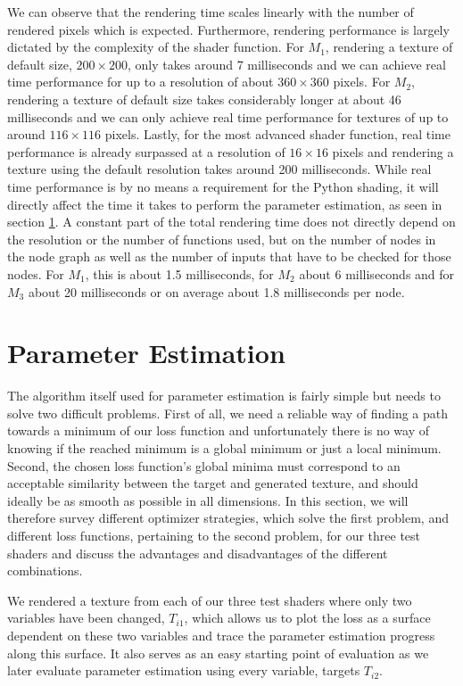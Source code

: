 We can observe that the rendering time scales linearly with the number of rendered pixels which is expected. Furthermore, rendering performance is largely dictated by the complexity of the shader function. For $M_1$, rendering a texture of default size, $200\times 200$, only takes around 7 milliseconds and we can achieve real time performance for up to a resolution of about $360\times 360$ pixels. For $M_2$, rendering a texture of default size takes considerably longer at about 46 milliseconds and we can only achieve real time performance for textures of up to around $116\times 116$ pixels. Lastly, for the most advanced shader function, real time performance is already surpassed at a resolution of $16\times 16$ pixels and rendering a texture using the default resolution takes around 200 milliseconds. While real time performance is by no means a requirement for the Python shading, it will directly affect the time it takes to perform the parameter estimation, as seen in section \ref{sec:EvalParameterEstimation}. A constant part of the total rendering time does not directly depend on the resolution or the number of functions used, but on the number of nodes in the node graph as well as the number of inputs that have to be checked for those nodes. For $M_1$, this is about 1.5 milliseconds, for $M_2$ about 6 milliseconds and for $M_3$ about 20 milliseconds or on average about 1.8 milliseconds per node. 

\section{Parameter Estimation}\label{sec:EvalParameterEstimation}

The algorithm itself used for parameter estimation is fairly simple but needs to solve two difficult problems. First of all, we need a reliable way of finding a path towards a minimum of our loss function and unfortunately there is no way of knowing if the reached minimum is a global minimum or just a local minimum. Second, the chosen loss function's global minima must correspond to an acceptable similarity between the target and generated texture, and should ideally be as smooth as possible in all dimensions. In this section, we will therefore survey different optimizer strategies, which solve the first problem, and different loss functions, pertaining to the second problem, for our three test shaders and discuss the advantages and disadvantages of the different combinations.

We rendered a texture from each of our three test shaders where only two variables have been changed, $T_{i1}$, which allows us to plot the loss as a surface dependent on these two variables and trace the parameter estimation progress along this surface. It also serves as an easy starting point of evaluation as we later evaluate parameter estimation using every variable, targets $T_{i2}$.

